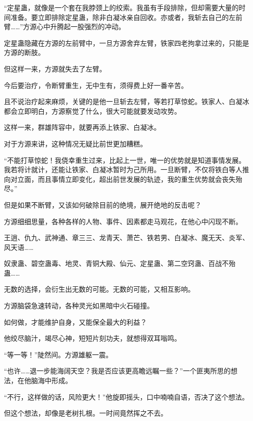 
\begin{this_body}



“定星蛊，就像是一个套在我脖颈上的绞索。我虽有手段排除，但却需要大量的时间准备。要立即排除定星蛊，除非白凝冰亲自回收。亦或者，我斩去自己的左前臂……”方源心中升腾起一股强烈的冲动。

定星蛊隐藏在方源的左前臂中，一旦方源舍弃左臂，铁家四老拘拿过来的，只能是方源的断肢。

但这样一来，方源就失去了左臂。

今后要治疗，令断臂重生，无中生有，须得费上好一番辛苦。

且不说治疗起来麻烦，关键的是他一旦斩去左臂，等若打草惊蛇。铁家人、白凝冰都会立即明白，方源察觉了什么，很大可能就要发动攻势。

这样一来，群雄阵容中，就要再添上铁家、白凝冰。

对于方源来讲，这种情况无疑比前世更加糟糕。

“不能打草惊蛇！我侥幸重生过来，比起上一世，唯一的优势就是知道事情发展。我若将计就计，还能让铁家、白凝冰暂时为己所用。一旦断臂，不仅将铁白等人推向对立面，而且事情立即变化，超出前世发展的轨迹，我的重生优势就会丧失殆尽。”

但是如果不断臂，又该如何破除目前的绝境，展开绝地的反击呢？

方源细细思量，各种各样的人物、事件、因素都走马观花，在他心中闪现不断。

王逍、仇九、武神通、章三三、龙青天、萧芒、铁若男、白凝冰、魔无天、炎军、风天语……

奴隶蛊、碧空蛊毒、地灵、青铜大殿、仙元、定星蛊、第二空窍蛊、百战不殆蛊……

无数的选择，会衍生出无数的可能。无数的可能，又相互影响。

方源脑袋急速转动，各种灵光如黑暗中火石碰撞。

如何做，才能维护自身，又能保全最大的利益？

他绞尽脑汁，竭尽心神，短短片刻功夫，就想得双耳嗡鸣。

“等一等！”陡然间。方源雄躯一震。

“也许……退一步能海阔天空？我是否应该更高瞻远瞩一些？”一个匪夷所思的想法，在他脑海中形成。

“不行，这样做的话，风险更大！”他旋即摇头，口中喃喃自语，否决了这个想法。

但这个想法，却像是老树扎根。一时间竟然挥之不去。


\end{this_body}
